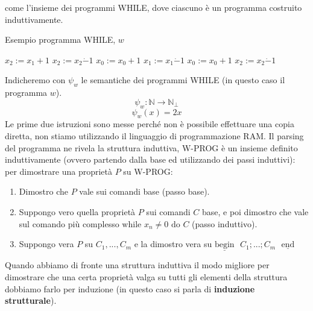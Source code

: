 \documentclass{article}
\begin{document}
come l'insieme dei programmi WHILE, dove ciascuno è un programma costruito induttivamente.
\begin{algorithm}[hbt!]
    \caption{Esempio programma WHILE, $w$}\label{alg:while-prog}
    $x_2:=x_1+1$\;
    $x_2:=x_2\dot{-}1$\;
    {
        $x_0:=x_0+1$\;
        $x_1:=x_1\dot{-}1$\;
    }
    {
        $x_0:=x_0+1$\;
        $x_2:=x_2\dot{-}1$\;
    }
\end{algorithm}
Indicheremo con $\psi_w$ le semantiche dei programmi WHILE (in questo caso il programma $w$).
$$\psi_w :\mathbb{N}\rightarrow\mathbb{N}_\bot$$
$$\psi_w (x)=2x$$
Le prime due istruzioni sono messe perché non è possibile effettuare una copia diretta,
non stiamo utilizzando il linguaggio di programmazione RAM.
Il parsing del programma ne rivela la struttura induttiva,
W-PROG è un insieme definito induttivamente (ovvero partendo
dalla base ed utilizzando dei passi induttivi): per dimostrare una proprietà $P$ su W-PROG:
\begin{enumerate}
    \item Dimostro che $P$ vale sui comandi base (passo base).

    \item Suppongo vero quella proprietà $P$ sui comandi $C$ base, e
          poi dimostro che vale sul comando più complesso $\text{while }x_n\neq 0\text{ do } C$
          (passo induttivo).

    \item Suppongo vera $P$ su $C_1,...,C_m$ e la dimostro vera su $\underline{\text{begin}}\text{ }
              C_1;...;C_m\text{ }\underline{\text{end}}$
\end{enumerate}
Quando abbiamo di fronte una struttura induttiva il modo migliore per dimostrare che una certa proprietà valga su tutti
gli elementi della struttura dobbiamo farlo per induzione (in questo caso si parla di \textbf{induzione strutturale}).
\end{document}
